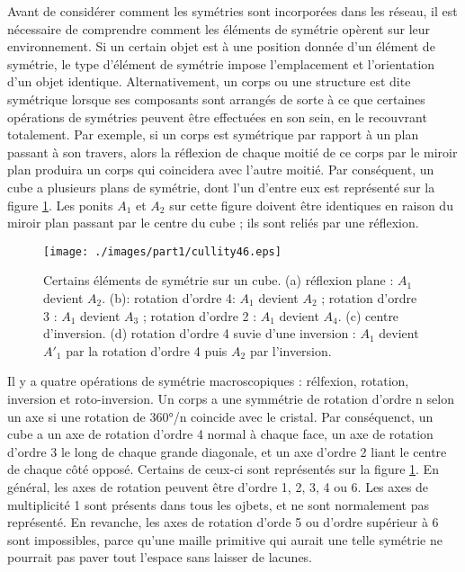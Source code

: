 Avant de considérer comment les symétries sont incorporées dans les réseau, il
est nécessaire de comprendre comment les éléments de symétrie opèrent sur leur
environnement. Si un certain objet est à une position donnée d'un élément de
symétrie, le type d'élément de symétrie impose l'emplacement et l'orientation
d'un objet identique. Alternativement, un corps ou une structure est dite
symétrique lorsque ses composants sont arrangés de sorte à ce que certaines
opérations de symétries peuvent être effectuées en son sein, en le recouvrant
totalement.
Par exemple, si un corps est symétrique par rapport à un plan passant à son
travers, alors la réflexion de chaque moitié de ce corps par le miroir plan
produira un corps qui coincidera avec l'autre moitié. Par conséquent, un cube a
plusieurs plans de symétrie, dont l'un d'entre eux est représenté sur la figure
\ref{cullity8}. Les ponits $A_1$ et $A_2$ sur cette figure doivent être
identiques en raison du miroir plan passant par le centre du cube ; ils sont
reliés par une réflexion.

\begin{figure}
    \texttt{[image: ./images/part1/cullity46.eps]}
    \caption{Certains éléments de symétrie sur un cube. (a) réflexion plane :
    $A_1$ devient $A_2$. (b): rotation d'ordre 4: $A_1$ devient $A_2$ ; rotation
    d'ordre 3 : $A_1$ devient $A_3$ ; rotation d'ordre 2 : $A_1$ devient $A_4$.
    (c) centre d'inversion. (d) rotation d'ordre 4 suvie d'une inversion : $A_1$
    devient $A'_1$ par la rotation d'ordre 4 puis $A_2$ par
l'inversion.}
    \label{cullity8}
\end{figure}

Il y a quatre opérations de symétrie macroscopiques : rélfexion, rotation,
inversion et roto-inversion. Un corps a une symmétrie de rotation d'ordre n selon
un axe si une rotation de 360°/n coincide avec le cristal. Par conséquenct, un
cube a un axe de rotation d'ordre 4 normal à chaque face, un axe de rotation
d'ordre 3 le long de chaque grande diagonale, et un axe d'ordre 2 liant le centre
de chaque côté opposé. Certains de ceux-ci sont représentés sur la figure
\ref{cullity8}. En général, les axes de rotation peuvent être d'ordre 1, 2, 3, 4
ou 6. Les axes de multiplicité 1 sont présents dans tous les ojbets, et ne sont
normalement pas représenté. En revanche, les axes de rotation d'orde 5 ou d'ordre
supérieur à 6 sont impossibles, parce qu'une maille primitive qui aurait une
telle symétrie ne pourrait pas paver tout l'espace sans laisser de lacunes.

